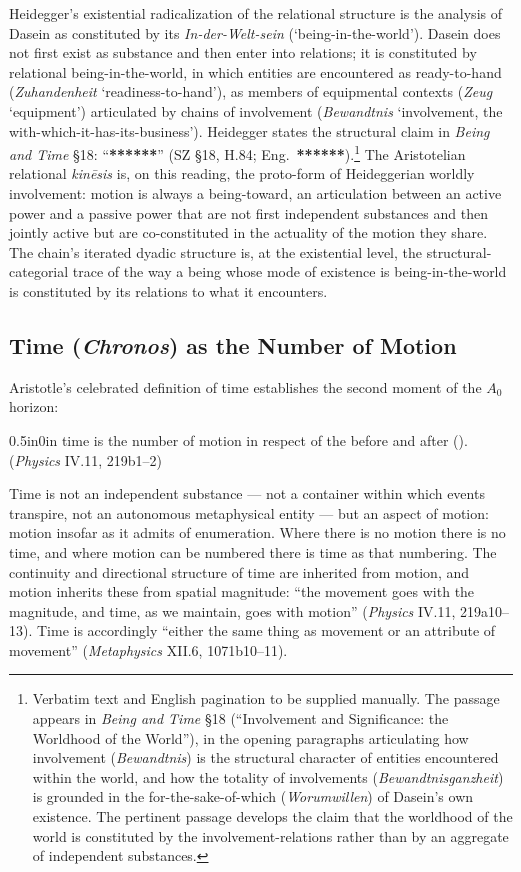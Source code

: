 Heidegger's existential radicalization of the relational structure is the analysis of Dasein as constituted by its \textit{In-der-Welt-sein} (`being-in-the-world'). Dasein does not first exist as substance and then enter into relations; it is constituted by relational being-in-the-world, in which entities are encountered as ready-to-hand (\textit{Zuhandenheit} `readiness-to-hand'), as members of equipmental contexts (\textit{Zeug} `equipment') articulated by chains of involvement (\textit{Bewandtnis} `involvement, the with-which-it-has-its-business'). Heidegger states the structural claim in \textit{Being and Time} \S 18: ``\textbf{******}'' (SZ \S 18, H.84; Eng.~\textbf{******}).\footnote{Verbatim text and English pagination to be supplied manually. The passage appears in \textit{Being and Time} \S 18 (``Involvement and Significance: the Worldhood of the World''), in the opening paragraphs articulating how involvement (\textit{Bewandtnis}) is the structural character of entities encountered within the world, and how the totality of involvements (\textit{Bewandtnisganzheit}) is grounded in the for-the-sake-of-which (\textit{Worumwillen}) of Dasein's own existence. The pertinent passage develops the claim that the worldhood of the world is constituted by the involvement-relations rather than by an aggregate of independent substances.} The Aristotelian relational \textit{kinēsis} is, on this reading, the proto-form of Heideggerian worldly involvement: motion is always a being-toward, an articulation between an active power and a passive power that are not first independent substances and then jointly active but are co-constituted in the actuality of the motion they share. The chain's iterated dyadic structure is, at the existential level, the structural-categorial trace of the way a being whose mode of existence is being-in-the-world is constituted by its relations to what it encounters.

\subsection{Time (\textit{Chronos}) as the Number of Motion}

Aristotle's celebrated definition of time establishes the second moment of the $A_0$ horizon:
\begin{adjustwidth}{0.5in}{0in}
time is the number of motion in respect of the before and after (). (\textit{Physics} IV.11, 219b1--2)
\end{adjustwidth}
Time is not an independent substance --- not a container within which events transpire, not an autonomous metaphysical entity --- but an aspect of motion: motion insofar as it admits of enumeration. Where there is no motion there is no time, and where motion can be numbered there is time as that numbering. The continuity and directional structure of time are inherited from motion, and motion inherits these from spatial magnitude: ``the movement goes with the magnitude, and time, as we maintain, goes with motion'' (\textit{Physics} IV.11, 219a10--13). Time is accordingly ``either the same thing as movement or an attribute of movement'' (\textit{Metaphysics} XII.6, 1071b10--11).

